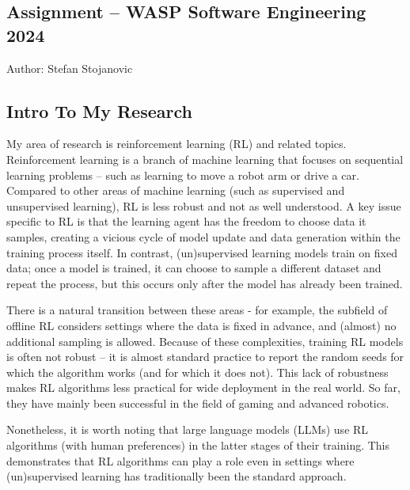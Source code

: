 \documentclass[11pt]{article}
\author{Stefan Stojanovic}
\begin{document}
\begin{center}
\section*{Assignment – WASP Software Engineering 2024}
    Author: Stefan Stojanovic
\end{center}


\subsection*{Intro To My Research}
My area of research is reinforcement learning (RL) and related topics. Reinforcement learning is a branch of machine learning that focuses on sequential learning problems – such as learning to move a robot arm or drive a car. Compared to other areas of machine learning (such as supervised and unsupervised learning), RL is less robust and not as well understood. A key issue specific to RL is that the learning agent has the freedom to choose data it samples, creating a vicious cycle of model update and data generation within the training process itself. In contrast, (un)supervised learning models train on fixed data; once a model is trained, it can choose to sample a different dataset and repeat the process, but this occurs only after the model has already been trained. 

There is a natural transition between these areas - for example, the subfield of offline RL considers settings where the data is fixed in advance, and (almost) no additional sampling is allowed. Because of these complexities, training RL models is often not robust – it is almost standard practice to report the random seeds for which the algorithm works (and for which it does not). This lack of robustness makes RL algorithms less practical for wide deployment in the real world. So far, they have mainly been successful in the field of gaming and advanced robotics. 

Nonetheless, it is worth noting that large language models (LLMs) use RL algorithms (with human preferences) in the latter stages of their training. This demonstrates that RL algorithms can play a role even in settings where (un)supervised learning has traditionally been the standard approach.  
\end{document}
